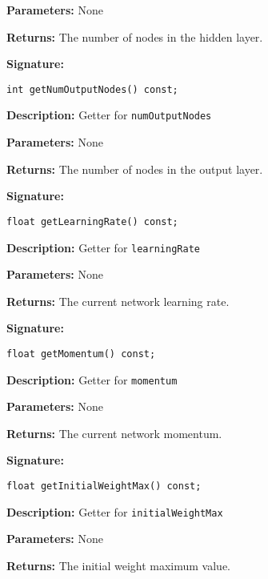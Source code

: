 \documentclass[a4paper]{article}
\begin{document}
\textbf{Parameters: } None

\textbf{Returns: }
The number of nodes in the hidden layer.

\hrulefill %

\textbf{Signature:} \begin{lstlisting}
int getNumOutputNodes() const;
\end{lstlisting}

\textbf{Description: }
Getter for \lstinline{numOutputNodes}

\textbf{Parameters: } None

\textbf{Returns: }
The number of nodes in the output layer.

\hrulefill %

\textbf{Signature:} \begin{lstlisting}
float getLearningRate() const;
\end{lstlisting}

\textbf{Description: }
Getter for \lstinline{learningRate}

\textbf{Parameters: } None

\textbf{Returns: }
The current network learning rate.

\hrulefill %

\textbf{Signature:} \begin{lstlisting}
float getMomentum() const;
\end{lstlisting}

\textbf{Description: }
Getter for \lstinline{momentum}

\textbf{Parameters: } None

\textbf{Returns: }
The current network momentum.

\hrulefill %

\textbf{Signature:} \begin{lstlisting}
float getInitialWeightMax() const;
\end{lstlisting}

\textbf{Description: }
Getter for \lstinline{initialWeightMax}

\textbf{Parameters: } None

\textbf{Returns: }
The initial weight maximum value.

\hrulefill %
\end{document}
